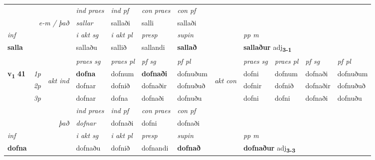 \begin{longtable}[l]{X>{\footnotesize\itshape}llXXXXlXXXX}
   && &  \textit{ind praes} & \textit{ind pf} & \textit{con praes} & \textit{con pf} \\*
\multicolumn{3}{r}{\textit{e-m / það}} & sallar & sallaði & salli & sallaði \\*

\cmidrule{4-7}
   {\textit{inf}} & &  & \textit{i akt sg} & \textit{i akt pl}   & \textit{presp} & \textit{supin}  && \textit{pp m} \\*
  {\textbf{salla}} & && sallaðu  & sallið   & sallandi &  \textbf{sallað}  && \multicolumn{2}{l}{\textbf{sallaður} adj\textbf{\textsubscript{3-1}}} \\*

\midrule

 & &   & \textit{praes sg}  & \textit{praes pl}    & \textit{ pf sg} & \textit{pf pl} & & \textit{praes sg}  & \textit{praes pl}    & \textit{pf sg} & \textit{pf pl }  \\ \cmidrule{4-7} \cmidrule{9-12}
 \multirow{2}{*}{{{\textbf{v{\textsubscript{1}}} \Large{\textbf{41}}}}}  & 1p & \multirow{3}{*}{\begin{turn}{90}\textit{akt ind}\end{turn}} & \textbf{dofna} & dofnum & \textbf{dofnaði} & dofnuðum & \multirow{3}{*}{\begin{turn}{90}\textit{akt con}\end{turn}} &dofni & dofnum & dofnaði & dofnuðum\\*
 & 2p &  &  dofnar  & dofnið & dofnaðir & dofnuðuð & & dofnir & dofnið & dofnaðir & dofnuðuð \\*
 & 3p &  & dofnar & dofna & dofnaði & dofnuðu & & dofni & dofni& dofnaði & dofnuðu \\*
\cmidrule{4-7} \cmidrule{9-12}

   && &  \textit{ind praes} & \textit{ind pf} & \textit{con praes} & \textit{con pf} \\*
\multicolumn{3}{r}{\textit{það}} & dofnar & dofnaði & dofni & dofnaði \\*

\cmidrule{4-7}
   {\textit{inf}} & &  & \textit{i akt sg} & \textit{i akt pl}   & \textit{presp} & \textit{supin}  && \textit{pp m} \\*
  {\textbf{dofna}} & && dofnaðu  & dofnið   & dofnandi &  \textbf{dofnað}  && \multicolumn{2}{l}{\textbf{dofnaður} adj\textbf{\textsubscript{3-3}}} \\*

\midrule


\end{longtable}
